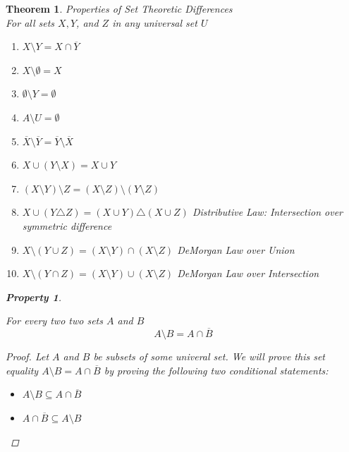 \documentclass{book}
\newtheorem{theorem}{Theorem}[section]
\newtheorem{property}{Property}[theorem]
\theoremstyle{definition}
\theoremstyle{remark}
\begin{document}
\begin{theorem}
Properties of Set Theoretic Differences \\

For all sets $X, Y$, and $Z$ in any universal set $U$ \\

    \begin{enumerate}
        \item $X \setminus Y = X \cap \overline{Y}$
        \item $X \setminus \emptyset = X$
        \item $\emptyset \setminus Y = \emptyset$
        \item $A \setminus U = \emptyset$
        \item $\overline{X} \setminus \overline{Y} = \overline{Y} \setminus \overline{X}$
        \item $X \cup (Y \setminus X) = X \cup Y$    
        \item $(X \setminus Y) \setminus Z = (X \setminus Z) \setminus (Y \setminus Z)$
        \item $X \cup (Y \triangle Z) = (X \cup Y) \triangle (X \cup Z)$ \textit{Distributive Law: Intersection over symmetric difference}
        \item $X \setminus (Y \cup Z) = (X \setminus Y) \cap (X \setminus Z)$ \textit{DeMorgan Law over Union}
        \item $X \setminus (Y \cap Z) = (X \setminus Y) \cup (X \setminus Z)$ \textit{DeMorgan Law over Intersection}
    \end{enumerate}

    \begin{property}    
        \begin{tcolorbox}
            For every two two sets $A$ and $B$
                \begin{equation*}
                    A \setminus B = A \cap \overline{B}
                \end{equation*}
        \end{tcolorbox}


        \begin{proof}
            Let $A$ and $B$ be subsets of some univeral set. We will prove this set equality $A \setminus B = A \cap \overline{B}$ by proving the following two conditional statements:
                \begin{itemize}
                    \item $A \setminus B \subseteq A \cap \overline{B}$
                    \item $A \cap \overline{B} \subseteq A \setminus B$
                \end{itemize}
            

\end{proof}
\end{property}
\end{theorem}
\end{document}
